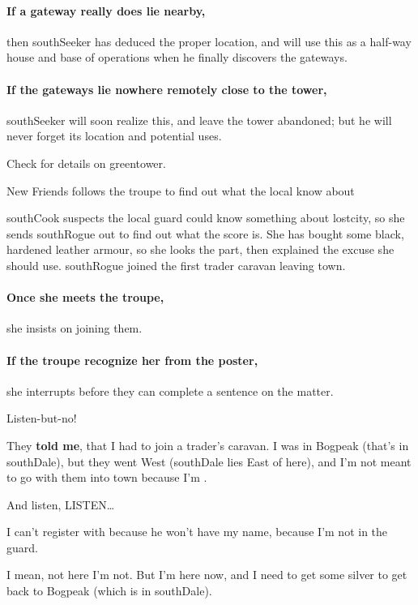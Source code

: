 \paragraph{If a gateway really does lie nearby,}
then \gls{southSeeker} has deduced the proper location, and will use this as a half-way house and base of operations when he finally discovers the gateways.

\paragraph{If the gateways lie nowhere remotely close to the tower,}
\gls{southSeeker} will soon realize this, and leave the tower abandoned; but he will never forget its location and potential uses.

Check  for details on \gls{greentower}.

{New Friends}%
{ follows the troupe to find out what the local  know about }%

\Gls{southCook} suspects the local \gls{guard} could know something about \gls{lostcity}, so she sends \gls{southRogue} out to find out what the score is.
She has bought  some black, hardened leather armour, so she looks the part, then explained the excuse she should use.
\Gls{southRogue} joined the first trader caravan leaving \gls{town}.

\paragraph{Once she meets the troupe,}
she insists on joining them.

\paragraph{If the troupe recognize her from the poster,}
she interrupts before they can complete a sentence on the matter.

\begin{exampletext}
  Listen-but-no!
  
  They \textbf {told me}, that I had to join a trader's caravan.
  I was in Bogpeak (that's in \gls{southDale}), but they went West (\gls{southDale} lies East of here), and I'm not meant to go with them into \gls{town} because I'm .
  
  And listen, LISTEN\ldots

  I can't register with  because he won't have my name, because I'm not in the \gls{guard}.

  I mean, not here I'm not.
  But I'm here now, and I need to get some silver to get back to Bogpeak (which is in \gls{southDale}).
\end{exampletext}

